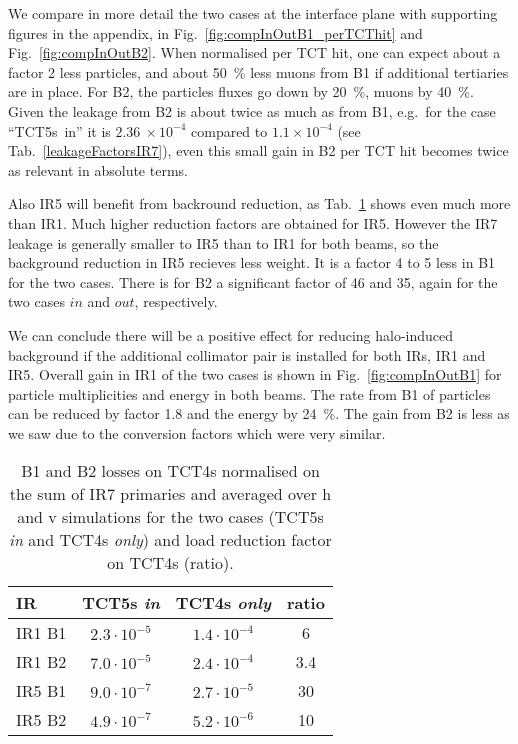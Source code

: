 

We compare in more detail the two cases at the interface plane with supporting figures in the appendix, in Fig.~\ref{fig:compInOutB1_perTCThit} and Fig.~\ref{fig:compInOutB2}. When normalised per TCT hit, one can expect about a factor 2 less particles, and about 50~\% less muons from B1 if additional tertiaries are in place. For B2, the particles fluxes go down by 20~\%, muons by 40~\%. Given the leakage from B2 is about twice as much as from B1, e.g.~for the case ``TCT5s~in'' it is $2.36~\times 10^{-4}$ compared to $1.1 \times 10^{-4}$ (see Tab.~\ref{leakageFactorsIR7}), even this small gain in B2 per TCT hit becomes twice as relevant in absolute terms.

Also IR5 will benefit from backround reduction, as Tab.~\ref{tab:compLosses} shows even much more than IR1. Much higher reduction factors are obtained for IR5. However the IR7 leakage is generally smaller to IR5 than to IR1 for both beams, so the background reduction in IR5 recieves less weight. It is a factor 4 to 5 less in B1 for the two cases. There is for B2 a significant factor of 46 and 35, again for the two cases $in$ and $out$, respectively.

We can conclude there will be a positive effect for reducing halo-induced background if the additional collimator pair is installed for both IRs, IR1 and IR5.
Overall gain in IR1 of the two cases is shown in Fig.~\ref{fig:compInOutB1} for particle multiplicities and energy in both beams. The rate from B1 of particles can be reduced by factor 1.8 and the energy by 24~\%. The gain from B2 is less as we saw due to the conversion factors which were very similar.

\begin{table}%
   \centering
   \caption{B1 and B2 losses on TCT4s  normalised on the sum of IR7 primaries and averaged over h and v simulations for the two cases (TCT5s \textit{in} and TCT4s \textit{only}) and load reduction factor on TCT4s (ratio).}
   \begin{tabular}{l|c|c|c}
       \hline
       IR & TCT5s \textit{in} &  TCT4s \textit{only} & ratio \\
       \hline\hline
       IR1 B1 & $2.3 \cdot 10^{-5}$ & $1.4 \cdot 10^{-4}$ & 6\\
       IR1 B2 & $7.0 \cdot 10^{-5}$ & $2.4 \cdot 10^{-4}$ & 3.4 \\ 
       IR5 B1 & $9.0 \cdot 10^{-7}$ & $2.7 \cdot 10^{-5}$ & 30\\
       IR5 B2 & $4.9 \cdot 10^{-7}$ & $5.2 \cdot 10^{-6}$ & 10\\

       \hline
   \end{tabular}
   \label{tab:compLosses}
\end{table}




